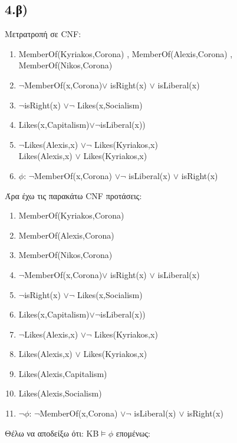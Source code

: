 \documentclass[12pt,a4paper]{article}
\begin{document}
\subsection*{4.β)}
Μετρατροπή σε \textlatin{CNF}:
\begin{enumerate}[label = \roman*)]
\item \textlatin{MemberOf(Kyriakos,Corona) , MemberOf(Alexis,Corona) , MemberOf(Nikos,Corona)}
\item \textlatin{$\neg$MemberOf(x,Corona)$\vee$ isRight(x) $\vee$ isLiberal(x)}
\item \textlatin{$\neg$isRight(x) $\vee\neg$ Likes(x,Socialism)}
\item \textlatin{Likes(x,Capitalism)$\vee\neg$isLiberal(x))}
\item \textlatin{$\neg$Likes(Alexis,x) $\vee\neg$ Likes(Kyriakos,x)\\Likes(Alexis,x) $\vee$ Likes(Kyriakos,x)}
\item \textlatin{$\phi$: $\neg$MemberOf(x,Corona) $\vee\neg$ isLiberal(x) $\vee$ isRight(x)}
\end{enumerate}
Άρα έχω τις παρακάτω \textlatin{CNF} προτάσεις: 
\begin{enumerate}
\item\textlatin{MemberOf(Kyriakos,Corona)}
\item\textlatin{MemberOf(Alexis,Corona)}
\item\textlatin{MemberOf(Nikos,Corona)}
\item\textlatin{$\neg$MemberOf(x,Corona)$\vee$ isRight(x) $\vee$ isLiberal(x)}
\item\textlatin{$\neg$isRight(x) $\vee\neg$ Likes(x,Socialism)}
\item\textlatin{Likes(x,Capitalism)$\vee\neg$isLiberal(x))}
\item\textlatin{$\neg$Likes(Alexis,x) $\vee\neg$ Likes(Kyriakos,x)}
\item\textlatin{Likes(Alexis,x) $\vee$ Likes(Kyriakos,x)}
\item\textlatin{Likes(Alexis,Capitalism)}
\item\textlatin{Likes(Alexis,Socialism)}
\item\textlatin{$\neg\phi$: $\neg$MemberOf(x,Corona) $\vee\neg$ isLiberal(x) $\vee$ isRight(x)}
\end{enumerate}
Θέλω να αποδείξω ότι: \textlatin{KB$\models\phi$} επομένως:
\end{document}
